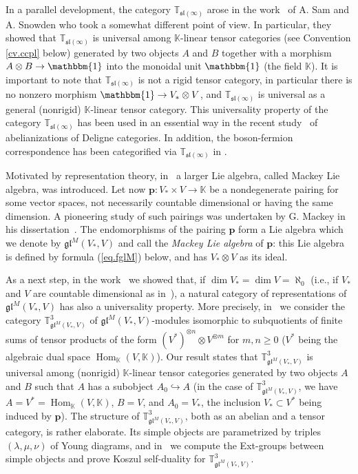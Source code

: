 \documentclass[11pt]{article}
\theoremstyle{plain}
\theoremstyle{nonumberplain}
\theoremstyle{plain}
\theoremstyle{nonumberplain}
\newcommand\bT{\mathbb T}
\newcommand\fgl{\mathfrak{gl}}
\newcommand\fsl{\mathfrak{sl}}
\DeclareMathOperator{\Hom}{\mathrm{Hom}}
\begin{document}
In a parallel development, the category $\mathbb{T}_{\fsl(\infty)}$
arose in the work~\cite{SS} of A. Sam and A. Snowden who took a
somewhat different point of view.  In particular, they showed that
$\mathbb{T}_{\fsl(\infty)}$ is universal among $\mathbb{K}$-linear tensor categories (see Convention \ref{cv.ccpl} below) generated by two objects $A$ and
$B$ together with a morphism $A\otimes B\to\mathbbm{1}$ into the
monoidal unit $\mathbbm{1}$ (the field $\mathbb{K}$).  It is important
to note that $\mathbb{T}_{\fsl(\infty)}$ is not a rigid tensor
category, in particular there is no nonzero morphism
$\mathbbm{1}\to V_*\otimes V$, and $\mathbb{T}_{\fsl(\infty)}$ is
universal as a general (nonrigid) $\mathbb{K}$-linear
tensor category.  This universality property of the category
$\mathbb{T}_{\fsl(\infty)}$ has been used in an essential way in the
recent study~\cite{EHS} of abelianizations of Deligne categories.  In addition, the boson-fermion correspondence has been categorified via $\bT_{\fsl(\infty)}$ in \cite{FSP}.

Motivated by representation theory, in~\cite{PS2} a larger Lie
algebra, called Mackey Lie algebra, was introduced.  Let now
$\mathbf{p}:V_*\times V\to\mathbb{K}$ be a nondegenerate pairing for
some vector spaces, not necessarily countable dimensional or having
the same dimension.  A pioneering study of such pairings was
undertaken by G. Mackey in his dissertation~\cite{M}.  The
endomorphisms of the pairing $\mathbf{p}$ form a Lie algebra which we
denote by $\fgl^M(V_*,V)$ and call the \emph{Mackey Lie algebra} of
$\mathbf{p}$: this Lie algebra is defined by formula (\ref{eq.fglM})
below, and has $V_*\otimes V$ as its ideal.

As a next step, in the work~\cite{us} we showed that, if
$\dim V_*=\dim V=\aleph_0$ (i.e., if $V_*$ and $V$ are countable
dimensional as in~\cite{DPS}), a natural category of representations
of $\fgl^M(V_*,V)$ has also a universality property.  More precisely,
in~\cite{us} we consider the category $\mathbb{T}^3_{\fgl^M(V_*,V)}$
of $\fgl^M(V_*,V)$-modules isomorphic to subquotients of finite sums
of tensor products of the form
$\left(V^*\right)^{\otimes n}\otimes V^{\otimes m}$ for $m,n\geq 0$
($V^*$ being the algebraic dual space $\Hom_\mathbb{K}(V,\mathbb{K})$).  Our
result states that $\mathbb{T}^3_{\fgl^M(V_*,V)}$ is universal among (nonrigid) $\mathbb{K}$-linear tensor categories generated
by two objects $A$ and $B$ such that $A$ has a subobject
$A_0\hookrightarrow A$ (in the case of $\mathbb{T}^3_{\fgl^M(V_*,V)}$,
we have $A=V^*=\Hom_\mathbb{K}(V,\mathbb{K})$, $B=V$, and $A_0=V_*$, the
inclusion $V_*\subset V^*$ being induced by $\mathbf{p}$).  The
structure of $\mathbb{T}^3_{\fgl^M(V_*,V)}$, both as an abelian and a
tensor category, is rather elaborate.  Its simple objects are
parametrized by triples $(\lambda,\mu,\nu)$ of Young diagrams, and
in~\cite{us} we compute the Ext-groups between simple objects and
prove Koszul self-duality for $\mathbb{T}^3_{\fgl^M(V_*,V)}$.
\end{document}
